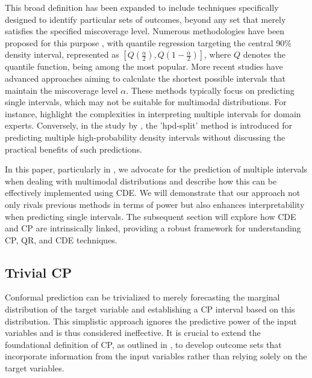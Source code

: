 This broad definition has been expanded to include techniques specifically designed to identify particular sets of outcomes, beyond any set that merely satisfies the specified miscoverage level. Numerous methodologies have been proposed for this purpose \cite{sesia2021conformal, chernozhukov2021distributional, balasubramanian2014conformal, shafer2008tutorial}, with quantile regression targeting the central 90\% density interval, represented as $[Q(\frac{\alpha}{2}), Q(1-\frac{\alpha}{2})]$, where $Q$ denotes the quantile function, being among the most popular. More recent studies \cite{sesia2021conformal, chernozhukov2021distributional} have advanced approaches aiming to calculate the shortest possible intervals that maintain the miscoverage level $\alpha$. These methods typically focus on predicting single intervals, which may not be suitable for multimodal distributions. For instance, \cite{sesia2021conformal} highlight the complexities in interpreting multiple intervals for domain experts. Conversely, in the study by \cite{izbicki2022cd}, the 'hpd-split' method is introduced for predicting multiple high-probability density intervals without discussing the practical benefits of such predictions.

In this paper, particularly in , we advocate for the prediction of multiple intervals when dealing with multimodal distributions and describe how this can be effectively implemented using CDE. We will demonstrate that our approach not only rivals previous methods in terms of power but also enhances interpretability when predicting single intervals. The subsequent section will explore how CDE and CP are intrinsically linked, providing a robust framework for understanding CP, QR, and CDE techniques.

\subsection{Trivial CP}\label{sec:trivial_cp}

Conformal prediction can be trivialized to merely forecasting the marginal distribution of the target variable and establishing a CP interval based on this distribution. This simplistic approach ignores the predictive power of the input variables and is thus considered ineffective. It is crucial to extend the foundational definition of CP, as outlined in , to develop outcome sets that incorporate information from the input variables rather than relying solely on the target variables.

